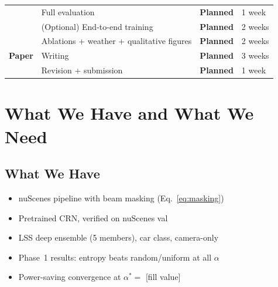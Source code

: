 \documentclass[12pt, a4paper]{article}
\theoremstyle{definition}
\begin{document}
\begin{center}
\begin{tabular}{llll}
  & Full evaluation & \textcolor{plannedpurple}{\textbf{Planned}} & 1 week \\
  & (Optional) End-to-end training & \textcolor{plannedpurple}{\textbf{Planned}} & 2 weeks \\
  \midrule
  \multirow{3}{*}{\textbf{Paper}}
  & Ablations + weather + qualitative figures & \textcolor{plannedpurple}{\textbf{Planned}} & 2 weeks \\
  & Writing & \textcolor{plannedpurple}{\textbf{Planned}} & 3 weeks \\
  & Revision + submission & \textcolor{plannedpurple}{\textbf{Planned}} & 1 week \\
  \bottomrule
\end{tabular}
\end{center}

\section{What We Have and What We Need}
\label{sec:summary}

\subsection*{What We Have}
\begin{itemize}[leftmargin=2em]
  \item[\textcolor{donegreen}{\textbf{v}}]
        nuScenes pipeline with beam masking (Eq.~\eqref{eq:masking})
  \item[\textcolor{donegreen}{\textbf{v}}]
        Pretrained CRN, verified on nuScenes val
  \item[\textcolor{donegreen}{\textbf{v}}]
        LSS deep ensemble (5 members), car class, camera-only
  \item[\textcolor{donegreen}{\textbf{v}}]
        Phase~1 results: entropy beats random/uniform at all $\alpha$
  \item[\textcolor{donegreen}{\textbf{v}}]
        Power-saving convergence at $\alpha^*=$ [fill value]
\end{itemize}
\end{document}
